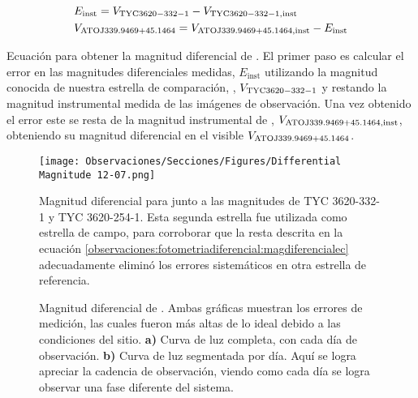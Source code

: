 \begin{eqfloat}[!ht]
	\begin{equation} \label{observaciones:fotometriadiferencial:magdiferencialec}
		\begin{split}
			& E_{\mathrm{inst}} = V_{\mathrm{TYC 3620-332-1}} - V_{\mathrm{TYC 3620-332-1}, \mathrm{inst}} \\
			& V_{\mathrm{ATO J339.9469+45.1464 \space}} = V_{\mathrm{ATO J339.9469+45.1464 \space}, \mathrm{inst}} - E_{\mathrm{inst}}
		\end{split}
	\end{equation}
	\caption{Ecuación para obtener la magnitud diferencial de \atoObjIdNoSpace.
	El primer paso es calcular el error en las magnitudes diferenciales medidas,
	$E_{\mathrm{inst}}$ utilizando la magnitud conocida de nuestra estrella de
	comparación, \compstarIdNoSpace, $ V_{\mathrm{TYC 3620-332-1}}$ y
	restando la magnitud instrumental medida de las imágenes de observación. Una
	vez obtenido el error este se resta de la magnitud instrumental de
	\atoObjIdNoSpace, $V_{\mathrm{ATO J339.9469+45.1464 \space}, \mathrm{inst}}$, obteniendo su
	magnitud diferencial en el visible $V_{\mathrm{ATO J339.9469+45.1464 \space}}$.}
\end{eqfloat}
	
\begin{figure}[!ht] 
	\centering
	\texttt{[image: Observaciones/Secciones/Figures/Differential Magnitude 12-07.png]}
	\caption{Magnitud diferencial para \atoObjId junto a las magnitudes de TYC
	3620-332-1 y TYC 3620-254-1. Esta segunda estrella fue utilizada como
	estrella de campo, para corroborar que la resta descrita en la ecuación
	\ref{observaciones:fotometriadiferencial:magdiferencialec} adecuadamente
	eliminó los errores sistemáticos en otra estrella de referencia.}
	\label{differentialMagDec7}
\end{figure}

\begin{figure}[!ht]
	\centering
	\caption{Magnitud diferencial de \atoObjIdNoSpace. Ambas gráficas muestran
	los errores de medición, las cuales fueron más altas de lo ideal debido a
	las condiciones del sitio. \textbf{a)} Curva de luz completa, con cada día
	de observación. \textbf{b)} Curva de luz segmentada por día. Aquí se logra
	apreciar la cadencia de observación, viendo como cada día se logra observar
	una fase diferente del sistema.}
	\label{iturbideAtoLightCurve}
\end{figure}